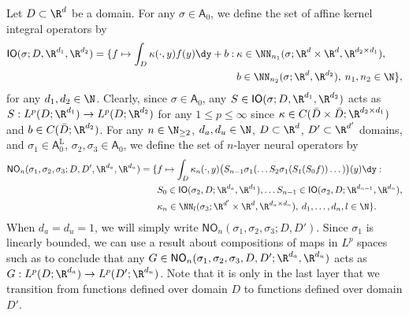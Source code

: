 Let \(D \subset \R^d\) be a domain.
For any \(\sigma \in \mathsf{A}_0\), we define the set of affine kernel integral operators by 
\begin{align*}
\mathsf{IO}(\sigma;D,\R^{d_1},\R^{d_2}) = \{f \mapsto \int_D \kappa(\cdot, y) f(y) \dy + b : \: &\kappa \in \NN_{n_1}(\sigma;\R^{d} \times \R^{d},\R^{d_2 \times d_1}), \\
&b \in \NN_{n_2}(\sigma;\R^{d},\R^{d_2}), \: n_1, n_2 \in \N\},
\end{align*}
for any \(d_1,d_2 \in \N\). Clearly, since \(\sigma \in \mathsf{A}_0\), any \(S \in \mathsf{IO}(\sigma;D,\R^{d_1},\R^{d_2})\) acts 
as \(S : L^p(D;\R^{d_1}) \to L^p(D;\R^{d_2})\) for any \(1 \leq p \leq \infty\) since \(\kappa \in C(\bar{D} \times \bar{D};\R^{d_2 \times d_1})\)
and \(b \in C(\bar{D};\R^{d_2})\).
For any \(n \in \N_{\geq 2}\), \(d_a,d_u \in \N\), \(D \subset \R^d\), \(D' \subset \R^{d'}\) domains, and \(\sigma_1 \in \mathsf{A}^{\text{L}}_0\), \(\sigma_2, \sigma_3 \in \mathsf{A}_0\), 
we define the set of \(n\)-layer neural operators by
\begin{align*}
\mathsf{NO}_n(\sigma_1,\sigma_2,\sigma_3;D,D',\R^{d_a},\R^{d_u}) = \{&f \mapsto \int_{D} \kappa_n (\cdot, y) \bigl ( S_{n-1} \sigma_1 ( \dots S_2 \sigma_1(S_1(S_0 f)) \dots) \bigl )(y) \dy : \\
&S_0 \in \mathsf{IO}(\sigma_2,D;\R^{d_a},\R^{d_1}), \dots S_{n-1} \in \mathsf{IO}(\sigma_2,D;\R^{d_{n-1}},\R^{d_n}), \\
&\kappa_n \in \NN_l (\sigma_3; \R^{d'} \times \R^{d}, \R^{d_u \times d_n}), \: d_1,\dots,d_n, l \in \N\}.
\end{align*}
When \(d_a = d_u = 1\), we will simply write \(\mathsf{NO}_n(\sigma_1,\sigma_2,\sigma_3;D,D')\).
Since \(\sigma_1\) is linearly bounded, we can use a result about compositions of maps in \(L^p\) spaces such as \cite[Theorem 7.13]{dudley2010concrete} to conclude that any \(G \in \mathsf{NO}_n(\sigma_1,\sigma_2,\sigma_3,D,D';\R^{d_a},\R^{d_u})\) acts as \(G : L^p(D;\R^{d_a}) \to L^p (D';\R^{d_u})\).
Note that it is only in the last layer that we transition from functions defined
over domain $D$ to functions defined over domain $D'$.


